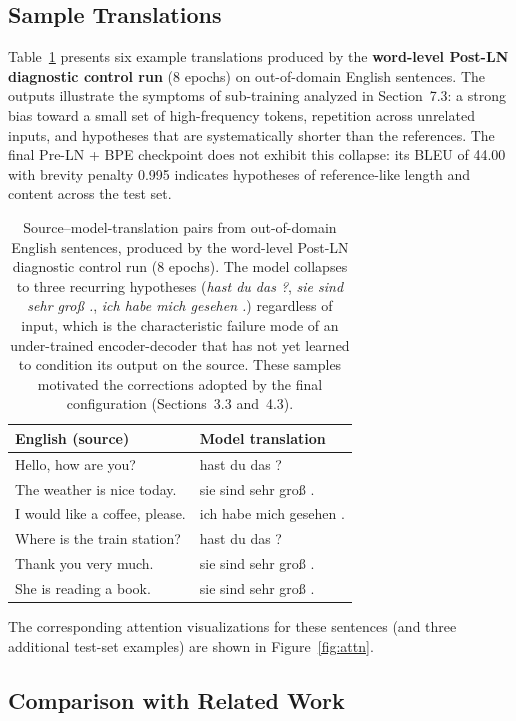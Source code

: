 \documentclass[10pt]{article}
\begin{document}
\subsection{Sample Translations}

Table~\ref{tab:samples} presents six example translations produced by the \textbf{word-level Post-LN diagnostic control run} (8 epochs) on out-of-domain English sentences. The outputs illustrate the symptoms of sub-training analyzed in Section~7.3: a strong bias toward a small set of high-frequency tokens, repetition across unrelated inputs, and hypotheses that are systematically shorter than the references. The final Pre-LN + BPE checkpoint does not exhibit this collapse: its BLEU of 44.00 with brevity penalty 0.995 indicates hypotheses of reference-like length and content across the test set.

\begin{table}[htbp]
\centering
\begin{tabular}{ll}
\toprule
\textbf{English (source)} & \textbf{Model translation} \\
\midrule
Hello, how are you? & hast du das ? \\
The weather is nice today. & sie sind sehr gro\ss{} . \\
I would like a coffee, please. & ich habe mich gesehen . \\
Where is the train station? & hast du das ? \\
Thank you very much. & sie sind sehr gro\ss{} . \\
She is reading a book. & sie sind sehr gro\ss{} . \\
\bottomrule
\end{tabular}
\caption{Source--model-translation pairs from out-of-domain English sentences, produced by the word-level Post-LN diagnostic control run (8 epochs). The model collapses to three recurring hypotheses (\textit{hast du das ?}, \textit{sie sind sehr gro\ss{} .}, \textit{ich habe mich gesehen .}) regardless of input, which is the characteristic failure mode of an under-trained encoder-decoder that has not yet learned to condition its output on the source. These samples motivated the corrections adopted by the final configuration (Sections~3.3 and~4.3).}
\label{tab:samples}
\end{table}

The corresponding attention visualizations for these sentences (and three additional test-set examples) are shown in Figure~\ref{fig:attn}.

\subsection{Comparison with Related Work}
\end{document}
